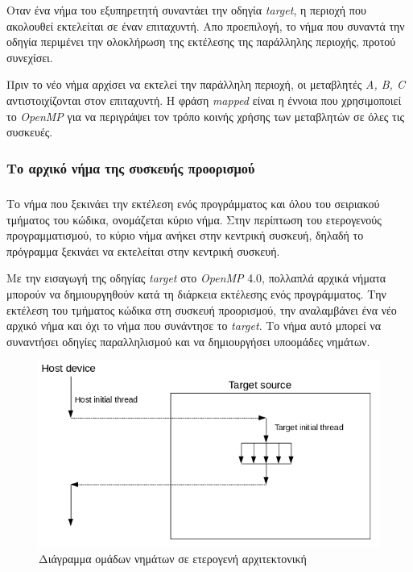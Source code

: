\documentclass[12pt]{article}
\newcommand{\en}[1]{\foreignlanguage{english}{#1}}
\begin{document}
Οταν ένα νήμα του εξυπηρετητή συναντάει την οδηγία \emph{\en{target}}, η περιοχή που ακολουθεί εκτελείται σε έναν επιταχυντή. Απο προεπιλογή, το νήμα που συναντά την οδηγία περιμένει την ολοκλήρωση της εκτέλεσης της παράλληλης περιοχής, προτού συνεχίσει.

Πριν το νέο νήμα αρχίσει να εκτελεί την παράλληλη περιοχή, οι μεταβλητές  \emph{\en{A, B, C}} αντιστοιχίζονται στον επιταχυντή. Η φράση \emph{\en{mapped}} είναι η έννοια που χρησιμοποιεί το \emph{\en{OpenMP}} για να περιγράψει τον τρόπο κοινής χρήσης των μεταβλητών σε όλες τις συσκευές.



\subsubsection{Το αρχικό νήμα της συσκευής προορισμού}
\subparagraph{}
Το νήμα που ξεκινάει την εκτέλεση ενός προγράμματος και όλου του σειριακού τμήματος του κώδικα, ονομάζεται κύριο νήμα.
Στην περίπτωση του ετερογενούς προγραμματισμού, το κύριο νήμα ανήκει στην κεντρική συσκευή, δηλαδή το πρόγραμμα ξεκινάει να εκτελείται στην κεντρική συσκευή. 

Με την εισαγωγή της οδηγίας \emph{\en{target}} στο \emph{\en{OpenMP}} 4.0, πολλαπλά αρχικά νήματα μπορούν να δημιουργηθούν κατά τη διάρκεια εκτέλεσης ενός προγράμματος. Την εκτέλεση του τμήματος κώδικα στη συσκευή προορισμού, την αναλαμβάνει ένα νέο αρχικό νήμα και όχι το νήμα που συνάντησε το \emph{\en{target}}. Το νήμα αυτό μπορεί να συναντήσει οδηγίες παραλληλισμού και να δημιουργήσει υποομάδες νημάτων.

\begin{figure}[h]
\includegraphics[width=\textwidth]{heter_1}
\centering
\captionsetup{justification=centering, singlelinecheck=false}
	\caption{Διάγραμμα ομάδων νημάτων σε ετερογενή αρχιτεκτονική}
\label{fig:heter_1}
\end{figure}
\end{document}
